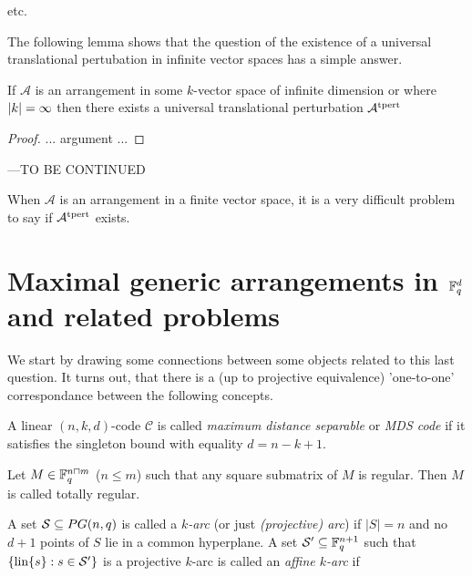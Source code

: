 \documentclass[a4paper]{article}
\begin{document}
\begin{definition}
    etc.
\end{definition}

The following lemma shows that the question of the existence of a universal translational pertubation in infinite vector spaces has a simple answer.

\begin{lemma}
    If $\mathcal{A}$ is an arrangement in some $k$-vector space of infinite dimension or where $\left|k\right|=\infty$ then there exists a universal translational perturbation $\mathcal{A}^{\mathop\mathrm{tpert}}$
\end{lemma}

\begin{proof}
    ... argument ...
\end{proof}

---TO BE CONTINUED


When $\mathcal{A}$ is an arrangement in a finite vector space, it is a very difficult problem to say if $\mathcal{A}^{\mathop\mathrm{tpert}}$ exists.

\section{Maximal generic arrangements in $\mathbb{F}_{q}^d$ and related problems}

We start by drawing some connections between some objects related to this last question.
It turns out, that there is a (up to projective equivalence) 'one-to-one' correspondance between the following concepts.

\begin{definition}
    A linear $(n,k,d)$-code $\mathcal{C}$ is called \emph{maximum distance separable} or \emph{MDS code} if it satisfies the singleton bound with equality $d=n-k+1$. 
\end{definition}

\begin{definition}
    Let $M\in\mathbb{F}_{q}^{n\mathbin{\sqcap} m}$ ($n\leq m$) such that any square submatrix of $M$ is regular. Then $M$ is called totally regular. 
\end{definition}

\begin{definition}[$k$-arc]
    A set $\mathcal{S}\subseteq PG(n,q)$ is called a \emph{$k$-arc} (or just \emph{(projective) arc}) if $|S|=n$ and no $d+1$ points of $S$ lie in a common hyperplane.
    A set $\mathcal{S}'\subseteq \mathbb{F}_{q}^{n+1}$ such that $\{\mathop\mathrm{lin}\{s\}:s\in\mathcal{S'}\}$ is a projective $k$-arc is called an \emph{affine $k$-arc} if 
\end{definition}
\end{document}

